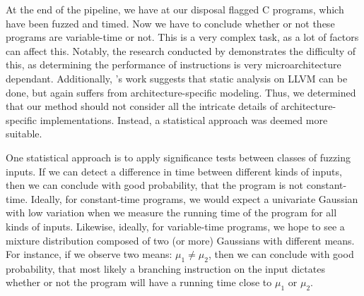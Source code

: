 \label{sec:statistical-analysis}
At the end of the pipeline, we have at our disposal flagged C programs, which have been fuzzed and timed. Now we have to conclude whether or not these programs are variable-time or not. This is a very complex task, as a lot of factors can affect this. Notably, the research conducted by \citeauthor{Abel19a} demonstrates the difficulty of this, as determining the performance of instructions is very microarchitecture dependant. Additionally, \cite{verifying-constant-time-llvm}'s work suggests that static analysis on LLVM can be done, but again suffers from architecture-specific modeling. Thus, we determined that our method should not consider all the intricate details of architecture-specific implementations. Instead, a statistical approach was deemed more suitable.

One statistical approach is to apply significance tests between classes of fuzzing inputs. If we can detect a difference in time between different kinds of inputs, then we can conclude with good probability, that the program is not constant-time. Ideally, for constant-time programs, we would expect a univariate Gaussian with low variation when we measure the running time of the program for all kinds of inputs. Likewise, ideally, for variable-time programs, we hope to see a mixture distribution composed of two (or more) Gaussians with different means. For instance, if we observe two means: $\mu_1 \neq \mu_2$, then we can conclude with good probability, that most likely a branching instruction on the input dictates whether or not the program will have a running time close to $\mu_1$ or $\mu_2$.



